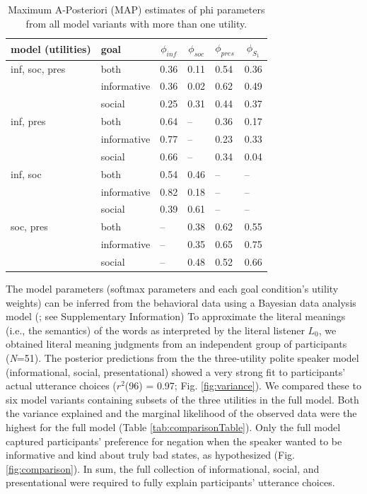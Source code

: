 \documentclass[9pt,twocolumn,twoside,lineno]{main_class_file}
\begin{document}
\begin{table}[tbp]
\begin{center}
\begin{threeparttable}
\caption{\label{tab:phi}Maximum A-Posteriori (MAP) estimates of phi parameters from all model variants with more than one utility.}
\begin{tabularx}{\columnwidth}{llllll}
\toprule
model (utilities) & \multicolumn{1}{l}{goal} & \multicolumn{1}{c}{$\phi_{inf}$} & \multicolumn{1}{c}{$\phi_{soc}$} & \multicolumn{1}{c}{$\phi_{pres}$} & \multicolumn{1}{c}{$\phi_{S_1}$}\\
\midrule
inf, soc, pres & both & 0.36 & 0.11 & 0.54 & 0.36\\
 & informative & 0.36 & 0.02 & 0.62 & 0.49\\
 & social & 0.25 & 0.31 & 0.44 & 0.37\\
inf, pres & both & 0.64 & -- & 0.36 & 0.17\\
 & informative & 0.77 & -- & 0.23 & 0.33\\
 & social & 0.66 & -- & 0.34 & 0.04\\
inf, soc & both & 0.54 & 0.46 & -- & --\\
 & informative & 0.82 & 0.18 & -- & --\\
 & social & 0.39 & 0.61 & -- & --\\
soc, pres & both & -- & 0.38 & 0.62 & 0.55\\
 & informative & -- & 0.35 & 0.65 & 0.75\\
 & social & -- & 0.48 & 0.52 & 0.66\\
\bottomrule
\end{tabularx}
\end{threeparttable}
\end{center}
\end{table}



The model parameters (softmax parameters and each goal condition's utility weights) can be inferred from the behavioral data using a Bayesian data analysis model (\cite{lee2014}; see Supplementary Information)
To approximate the literal meanings (i.e., the semantics) of the words as interpreted by the literal listener \(L_0\), we obtained literal meaning judgments from an independent group of participants
(\emph{N}=51).
The posterior predictions from the the three-utility polite speaker model (informational, social, presentational) showed a very strong fit to participants' actual utterance choices (\(r^2\)(96) = 0.97; Fig. \ref{fig:variance}).
We compared these to six model variants containing
subsets of the three utilities in the full model.
Both the variance explained and the marginal likelihood of the observed data were the
highest for the full model (Table \ref{tab:comparisonTable}). Only the
full model captured participants' preference for negation when the speaker wanted to be informative and kind
about truly bad states, as hypothesized (Fig. \ref{fig:comparison}).
In sum, the full collection of informational, social, and presentational were
required to fully explain participants' utterance choices.
\end{document}
